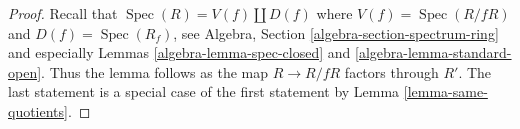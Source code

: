 \documentclass[10pt,a4paper]{amsart}
\theoremstyle{plain}
\theoremstyle{definition}
\theoremstyle{remark}
\numberwithin{equation}{subsection}
\def\Spec{\mathop{\mathrm{Spec}}}
\begin{document}
\begin{proof}
Recall that $\Spec(R) = V(f) \amalg D(f)$ where $V(f) = \Spec(R/fR)$
and $D(f) = \Spec(R_f)$, see
Algebra, Section \ref{algebra-section-spectrum-ring}
and especially Lemmas \ref{algebra-lemma-spec-closed} and
\ref{algebra-lemma-standard-open}.
Thus the lemma follows as the map $R \to R/fR$ factors through $R'$.
The last statement is a special
case of the first statement by Lemma \ref{lemma-same-quotients}.
\end{proof}
\end{document}
